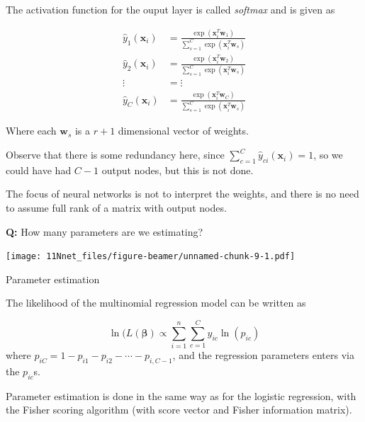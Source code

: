 \documentclass[10pt,ignorenonframetext,]{beamer}
\begin{document}
\begin{frame}

The activation function for the ouput layer is called \emph{softmax} and
is given as

\begin{align}
\hat{y}_1({\boldsymbol x}_i)&= \frac{\exp({\boldsymbol x}_i^T{\boldsymbol w}_1)}{\sum_{s=1}^{C}\exp({\boldsymbol x}_i^T{\boldsymbol w}_s)}\\
{\hat y_2}({\boldsymbol x}_i)& = \frac{\exp({\boldsymbol x}_i^T{\boldsymbol w}_2)}{\sum_{s=1}^{C}\exp({\boldsymbol x}_i^T{\boldsymbol w}_s)}\\
\vdots & = \vdots \\
{\hat y_C}({\boldsymbol x}_i)&= \frac{\exp({\boldsymbol x}_i^T{\boldsymbol w}_C)}{\sum_{s=1}^{C}\exp({\boldsymbol x}_i^T{\boldsymbol w}_s)}
\end{align}

Where each \({\boldsymbol w}_s\) is a \(r+1\) dimensional vector of
weights.

Observe that there is some redundancy here, since
\(\sum_{c=1}^C {\hat y}_{ci}({\boldsymbol x}_i)=1\), so we could have
had \(C-1\) output nodes, but this is not done.

The focus of neural networks is not to interpret the weights, and there
is no need to assume full rank of a matrix with output nodes.

\textbf{Q:} How many parameters are we estimating?

\end{frame}

\begin{frame}

\texttt{[image: 11Nnet\_files/figure-beamer/unnamed-chunk-9-1.pdf]}

\end{frame}

\begin{frame}

\begin{block}{Parameter estimation}

The likelihood of the multinomial regression model can be written as

\[ \ln(L({\boldsymbol \beta})\propto \sum_{i=1}^n \sum_{c=1}^C y_{ic}\ln(p_{ic})\]
where \(p_{iC}=1-p_{i1}-p_{i2}-\cdots -p_{i,C-1}\), and the regression
parameters enters via the \(p_{ic}\)s.

Parameter estimation is done in the same way as for the logistic
regression, with the Fisher scoring algorithm (with score vector and
Fisher information matrix).

\end{block}

\end{frame}
\end{document}
